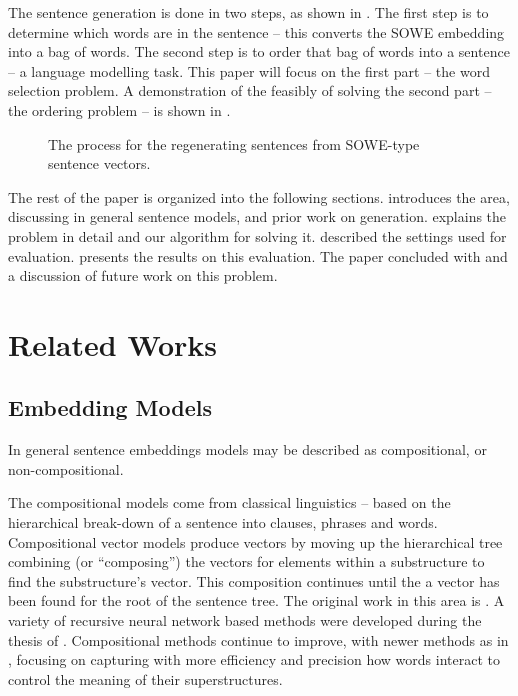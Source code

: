 \documentclass[11pt]{article}
\theoremstyle{plain}
\theoremstyle{definition}
\begin{document}
The sentence generation is done in two steps, as shown in . The first step is to determine which words are in the sentence -- this converts the SOWE embedding into a bag of words. The second step is to order that bag of words into a sentence -- a language modelling task. This paper will focus on the first part -- the word selection problem. A demonstration of the feasibly of solving the second part -- the ordering problem --  is shown in .

\begin{figure}
	\centering 
	
	\caption{The process for the regenerating sentences from SOWE-type sentence vectors. }
	\label{block_diagram}
\end{figure}

The rest of the paper is organized into the following sections.  introduces the area, discussing in general sentence models, and prior work on generation.  explains the problem in detail and our algorithm for solving it.  described the settings used for evaluation.  presents the results on this evaluation. The paper concluded with  and a discussion of future work on this problem.


\section{Related Works}\label{relwork}
\subsection{Embedding Models}
In general sentence embeddings models may be described as compositional, or non-compositional. 

The compositional models come from classical linguistics -- based on the hierarchical  break-down of a sentence into clauses, phrases and words. Compositional vector models produce vectors by moving up the hierarchical tree combining (or ``composing'') the vectors for elements within a substructure to find the substructure's vector. This composition continues until the a vector has been found for the root of the sentence tree. The original work in this area is \textcite{Mitchell2008}. A variety of recursive neural network based methods were developed during the thesis of \textcite{socher2014recursive}. Compositional methods continue to improve, with newer methods as in \textcite{TACL15CompVector}, focusing on capturing with more efficiency and precision how words interact to control the meaning of their superstructures. 
\end{document}
